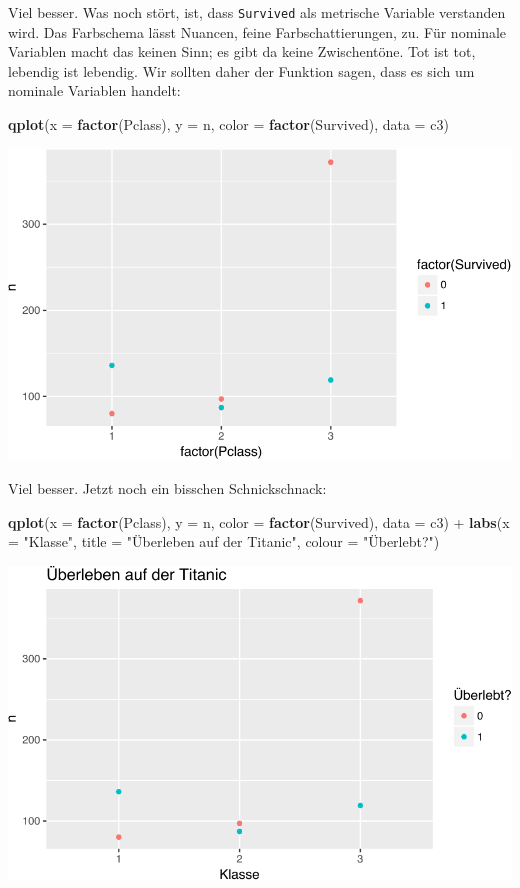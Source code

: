 \documentclass[12pt,]{book}
\newenvironment{Shaded}{\begin{snugshade}}{\end{snugshade}}
\newcommand{\KeywordTok}[1]{\textcolor[rgb]{0.13,0.29,0.53}{\textbf{{#1}}}}
\newcommand{\DataTypeTok}[1]{\textcolor[rgb]{0.13,0.29,0.53}{{#1}}}
\newcommand{\StringTok}[1]{\textcolor[rgb]{0.31,0.60,0.02}{{#1}}}
\newcommand{\NormalTok}[1]{{#1}}
\begin{document}
Viel besser. Was noch stört, ist, dass \texttt{Survived} als metrische
Variable verstanden wird. Das Farbschema lässt Nuancen, feine
Farbschattierungen, zu. Für nominale Variablen macht das keinen Sinn; es
gibt da keine Zwischentöne. Tot ist tot, lebendig ist lebendig. Wir
sollten daher der Funktion sagen, dass es sich um nominale Variablen
handelt:

\begin{Shaded}
\begin{Highlighting}[]
\KeywordTok{qplot}\NormalTok{(}\DataTypeTok{x =} \KeywordTok{factor}\NormalTok{(Pclass), }\DataTypeTok{y =} \NormalTok{n, }\DataTypeTok{color =} \KeywordTok{factor}\NormalTok{(Survived), }\DataTypeTok{data =} \NormalTok{c3)}
\end{Highlighting}
\end{Shaded}

\begin{center}\includegraphics[width=0.7\linewidth]{075_Fallstudie_Titanic_files/figure-latex/unnamed-chunk-7-1} \end{center}

Viel besser. Jetzt noch ein bisschen Schnickschnack:

\begin{Shaded}
\begin{Highlighting}[]
\KeywordTok{qplot}\NormalTok{(}\DataTypeTok{x =} \KeywordTok{factor}\NormalTok{(Pclass), }\DataTypeTok{y =} \NormalTok{n, }\DataTypeTok{color =} \KeywordTok{factor}\NormalTok{(Survived), }\DataTypeTok{data =} \NormalTok{c3) +}\StringTok{ }
\StringTok{  }\KeywordTok{labs}\NormalTok{(}\DataTypeTok{x =} \StringTok{"Klasse"}\NormalTok{, }
       \DataTypeTok{title =} \StringTok{"Überleben auf der Titanic"}\NormalTok{,}
       \DataTypeTok{colour =} \StringTok{"Überlebt?"}\NormalTok{)}
\end{Highlighting}
\end{Shaded}

\begin{center}\includegraphics[width=0.7\linewidth]{075_Fallstudie_Titanic_files/figure-latex/unnamed-chunk-8-1} \end{center}
\end{document}
